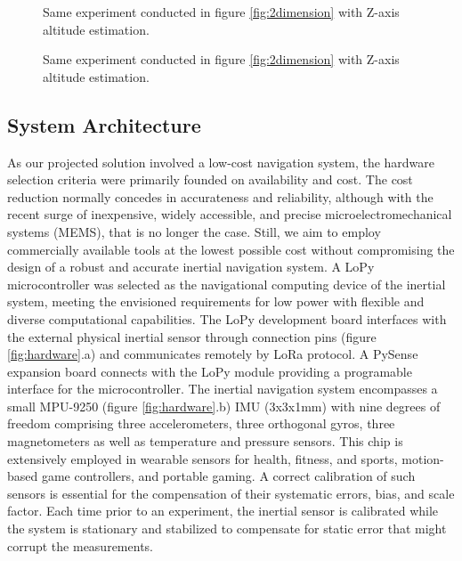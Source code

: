 \begin{figure}[!h]
    
    \caption{Same experiment conducted in figure \ref{fig:2dimension}  with Z-axis altitude estimation. }
    \label{fig:3dimensions}
\end{figure}


\begin{figure}[!h]
    
    \caption{Same experiment conducted in figure \ref{fig:2dimension}  with Z-axis altitude estimation. }
    \label{fig:3dimensions}
\end{figure}





\subsection{System Architecture}
As our projected solution involved a low-cost navigation system, the hardware selection criteria were primarily founded on availability and cost. The cost reduction normally concedes in accurateness and reliability, although with the recent surge of inexpensive, widely accessible, and precise microelectromechanical systems (MEMS), that is no longer the case. Still, we aim to employ commercially available tools at the lowest possible cost without compromising the design of a robust and accurate inertial navigation system. A LoPy microcontroller was selected as the navigational computing device of the inertial system, meeting the envisioned requirements for low power with flexible and diverse computational capabilities. The LoPy development board interfaces with the external physical inertial sensor through connection pins (figure \ref{fig:hardware}.a) and communicates remotely by LoRa protocol. A PySense expansion board connects with the LoPy module providing a programable interface for the microcontroller. The inertial navigation system encompasses a small MPU-9250 (figure \ref{fig:hardware}.b) IMU (3x3x1mm) with nine degrees of freedom comprising three accelerometers, three orthogonal gyros, three magnetometers as well as temperature and pressure sensors. This chip is extensively employed in wearable sensors for health, fitness, and sports, motion-based game controllers, and portable gaming. A correct calibration of such sensors is essential for the compensation of their systematic errors, bias, and scale factor. Each time prior to an experiment, the inertial sensor is calibrated while the system is stationary and stabilized to compensate for static error that might corrupt the measurements.

